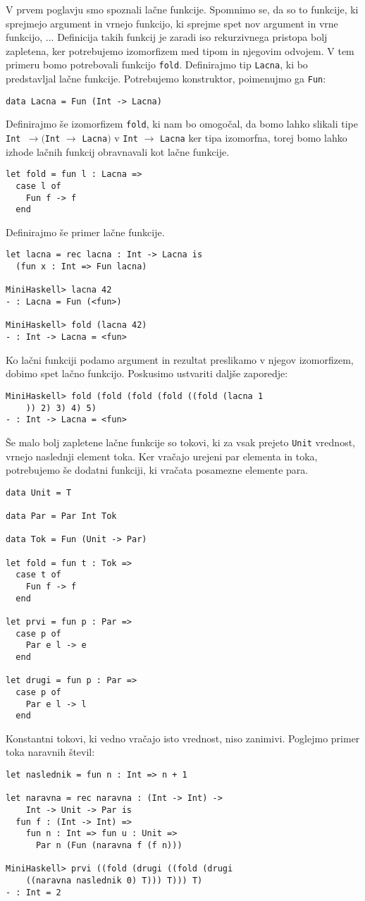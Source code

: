 \documentclass[12pt,a4paper,openany]{book}
\begin{document}
V prvem poglavju smo spoznali lačne funkcije. Spomnimo se, da so to funkcije, ki sprejmejo argument in vrnejo funkcijo, ki sprejme spet nov argument in vrne funkcijo, ... Definicija 
takih funkcij je zaradi iso rekurzivnega pristopa bolj zapletena, ker potrebujemo izomorfizem med tipom in njegovim odvojem. V tem primeru bomo potrebovali funkcijo \lstinline{fold}. 
Definirajmo tip \lstinline{Lacna}, ki bo predstavljal lačne funkcije. Potrebujemo konstruktor, poimenujmo ga \lstinline{Fun}:
\begin{lstlisting}
data Lacna = Fun (Int -> Lacna)
\end{lstlisting}
Definirajmo še izomorfizem \lstinline{fold}, ki nam bo omogočal, da bomo lahko slikali tipe \lstinline{Int }$\rightarrow ($\lstinline{Int} $\rightarrow$ \lstinline{Lacna}$)$ v \lstinline{Int} $\rightarrow$ \lstinline{Lacna} 
ker tipa izomorfna, torej bomo lahko izhode lačnih funkcij obravnavali kot lačne funkcije.
\begin{lstlisting}
let fold = fun l : Lacna =>
  case l of
    Fun f -> f
  end
\end{lstlisting}
Definirajmo še primer lačne funkcije.
\begin{lstlisting}
let lacna = rec lacna : Int -> Lacna is
  (fun x : Int => Fun lacna)

MiniHaskell> lacna 42
- : Lacna = Fun (<fun>)

MiniHaskell> fold (lacna 42)
- : Int -> Lacna = <fun>
\end{lstlisting}
Ko lačni funkciji podamo argument in rezultat preslikamo v njegov izomorfizem, dobimo spet lačno funkcijo. Poskusimo ustvariti daljše zaporedje:
\begin{lstlisting}
MiniHaskell> fold (fold (fold (fold ((fold (lacna 1
    )) 2) 3) 4) 5)
- : Int -> Lacna = <fun>
\end{lstlisting}

Še malo bolj zapletene lačne funkcije so tokovi, ki za vsak prejeto \lstinline{Unit} vrednost, vrnejo naslednji element toka. Ker vračajo urejeni 
par elementa in toka, potrebujemo še dodatni funkciji, ki vračata posamezne elemente para.
\begin{lstlisting}
data Unit = T

data Par = Par Int Tok

data Tok = Fun (Unit -> Par)

let fold = fun t : Tok =>
  case t of
    Fun f -> f
  end

let prvi = fun p : Par =>
  case p of
    Par e l -> e
  end

let drugi = fun p : Par =>
  case p of
    Par e l -> l
  end
\end{lstlisting}
Konstantni tokovi, ki vedno vračajo isto vrednost, niso zanimivi. Poglejmo 
primer toka naravnih števil:
\begin{lstlisting}
let naslednik = fun n : Int => n + 1

let naravna = rec naravna : (Int -> Int) -> 
    Int -> Unit -> Par is
  fun f : (Int -> Int) =>
    fun n : Int => fun u : Unit =>
      Par n (Fun (naravna f (f n)))

MiniHaskell> prvi ((fold (drugi ((fold (drugi 
    ((naravna naslednik 0) T))) T))) T)
- : Int = 2
\end{lstlisting}
\end{document}
